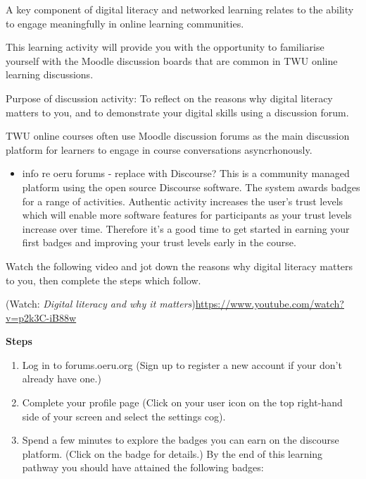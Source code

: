 \documentclass[
]{book}
\providecommand{\tightlist}{%
  \setlength{\itemsep}{0pt}\setlength{\parskip}{0pt}}
\theoremstyle{definition}
\theoremstyle{definition}
\theoremstyle{definition}
\theoremstyle{definition}
\theoremstyle{remark}
\begin{document}
\begin{reflect}
A key component of digital literacy and networked learning relates to the ability to engage meaningfully in online learning communities.

This learning activity will provide you with the opportunity to familiarise yourself with the Moodle discussion boards that are common in TWU online learning discussions.

Purpose of discussion activity:
To reflect on the reasons why digital literacy matters to you, and to demonstrate your digital skills using a discussion forum.

TWU online courses often use Moodle discussion forums as the main discussion platform for learners to engage in course conversations asyncrhonously.

\begin{itemize}
\tightlist
\item
  info re oeru forums - replace with Discourse?
  This is a community managed platform using the open source Discourse software. The system awards badges for a range of activities. Authentic activity increases the user's trust levels which will enable more software features for participants as your trust levels increase over time. Therefore it's a good time to get started in earning your first badges and improving your trust levels early in the course.
\end{itemize}

Watch the following video and jot down the reasons why digital literacy matters to you, then complete the steps which follow.

(Watch: \emph{Digital literacy and why it matters}){\url{https://www.youtube.com/watch?v=p2k3C-iB88w}}

\textbf{Steps}

\begin{enumerate}
\def\labelenumi{\arabic{enumi}.}
\tightlist
\item
  Log in to forums.oeru.org (Sign up to register a new account if your don't already have one.)\\
\item
  Complete your profile page (Click on your user icon on the top right-hand side of your screen and select the settings cog).\\
\item
  Spend a few minutes to explore the badges you can earn on the discourse platform. (Click on the badge for details.) By the end of this learning pathway you should have attained the following badges:


\end{enumerate}
\end{reflect}
\end{document}
